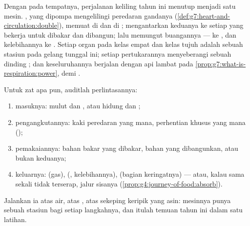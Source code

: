 \begin{proposition}\label{prop:g7:removing-wastes:complete}
Dengan  pada tempatnya, perjalanan keliling tahun ini menutup
menjadi satu mesin. , yang dipompa mengelilingi peredaran
gandanya (\cref{def:g7:heart-and-circulation:double}), memuat 
di  dan  di ; mengantarkan keduanya
ke setiap  yang bekerja untuk dibakar dan dibangun; lalu memungut
buangannya ---  ke ,  dan kelebihannya
ke . Setiap organ pada kelas empat dan kelas tujuh adalah
sebuah stasiun pada gelang tunggal ini; setiap pertukarannya
menyeberangi sebuah dinding ; dan keseluruhannya berjalan
dengan api lambat pada \cref{prop:g7:what-is-respiration:power}, 
demi .
\end{proposition}
\admitted

\begin{method}\label{met:g7:removing-wastes:audit}
Untuk zat apa pun, auditlah perlintasannya:
\begin{enumerate}
  \item masuknya: mulut dan , atau hidung dan ;
  \item pengangkutannya: kaki peredaran yang mana, perhentian khusus
        yang mana ();
  \item pemakaiannya: bahan bakar yang dibakar, bahan yang dibangunkan,
        atau bukan keduanya;
  \item keluarnya:  (gas),  (, kelebihannya), 
        (bagian keringatnya) --- atau, kalau sama sekali tidak
        terserap, jalur sisanya
        (\cref{prop:g4:journey-of-food:absorb}).
\end{enumerate}
Jalankan ia atas air, atas , atas sekeping keripik yang asin:
mesinnya punya sebuah stasiun bagi setiap langkahnya, dan itulah
temuan tahun ini dalam satu latihan.
\end{method}

